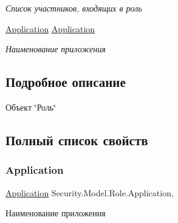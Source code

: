 \begin{DoxyCompactItemize}
\begin{DoxyCompactList}\small\item\em Список участников, входящих в роль \end{DoxyCompactList}\item 
\hyperlink{class_security_1_1_model_1_1_application}{Application} \hyperlink{class_security_1_1_model_1_1_role_aafcb3137bdd9631a11c246db1c2d62c6}{Application}
\begin{DoxyCompactList}\small\item\em Наименование приложения \end{DoxyCompactList}\end{DoxyCompactItemize}


\subsection{Подробное описание}
Объект \char`\"{}Роль\char`\"{} 



\subsection{Полный список свойств}
\mbox{\label{class_security_1_1_model_1_1_role_aafcb3137bdd9631a11c246db1c2d62c6}} 
\subsubsection{\texorpdfstring{Application}{Application}}
{\footnotesize\ttfamily \hyperlink{class_security_1_1_model_1_1_application}{Application} Security.\+Model.\+Role.\+Application\hspace{0.3cm}{\ttfamily [get]}, {\ttfamily [set]}}



Наименование приложения 

\mbox{\label{class_security_1_1_model_1_1_role_a8543ffa11051292477a3e6dcaf48acc0}} 
